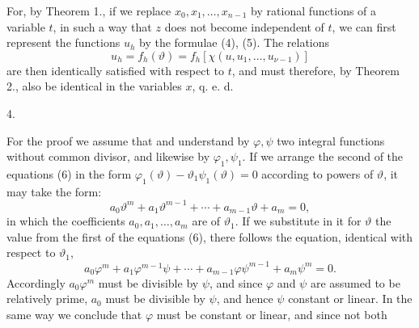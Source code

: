 
For, by Theorem 1., if we replace
$x_0, x_1, \ldots, x_{n-1}$ by rational functions of a variable $t$,
in such a way that $z$ does not become independent of $t$, we can first represent the functions
$u_h$ by the formulae (4), (5). The relations
\[
u_h = f_h(\vartheta) = f_h[\chi(u, u_1, \ldots, u_{\nu-1})]
\]
are then identically satisfied with respect to $t$, and must therefore,
by Theorem 2., also be identical in the variables $x$,
q. e. d.

4.~

For the proof we assume that
and understand by $\varphi, \psi$ two integral functions without common
 divisor, and likewise by $\varphi_1, \psi_1$. If we arrange the second of the
equations (6) in the form $\varphi_1(\vartheta) - \vartheta_1\psi_1(\vartheta) = 0$ according to powers
 of $\vartheta$, it may take the form:
\[
a_0\vartheta^m + a_1\vartheta^{m-1} + \cdots + a_{m-1}\vartheta + a_m = 0,
\]
in which the coefficients $a_0, a_1, \ldots, a_m$ are 
 of $\vartheta_1$. If we substitute in it for $\vartheta$ the value
from the first of the equations (6), there follows the equation, identical
 with respect to $\vartheta_1$,
\[
a_0\varphi^m + a_1\varphi^{m-1}\psi + \cdots + a_{m-1}\varphi\psi^{m-1} + a_m\psi^m = 0.
\]
Accordingly $a_0\varphi^m$ must be divisible by $\psi$, and since $\varphi$
and $\psi$ are assumed to be relatively prime, $a_0$ must be divisible by $\psi$,
and hence $\psi$ constant or linear. In the same way we conclude
that $\varphi$ must be constant or linear, and since not both

